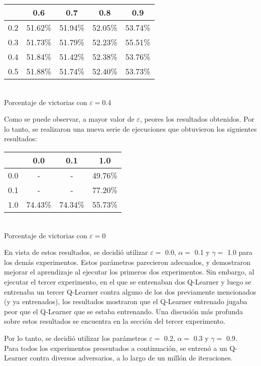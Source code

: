 \begin{center}
\begin{tabular}{|c||c|c|c|c|}
	\hline
	\backslashbox{$\alpha$}{$\gamma$} & 0.6 & 0.7 & 0.8 & 0.9\\
	\hline
	\hline
	0.2 & 51.62\% & 51.94\% & 52.05\% & 53.74\% \\
	\hline
	0.3 & 51.73\% & 51.79\% & 52.23\% & 55.51\% \\
	\hline
	0.4 & 51.84\% & 51.42\% & 52.38\% & \cellcolor{intvier}53.76\% \\
	\hline
	0.5 & 51.88\% & 51.74\% & 52.40\% & 53.73\% \\
	\hline
\end{tabular}\\
Porcentaje de victorias con $\varepsilon=0.4$
\end{center}

Como se puede observar, a mayor valor de $\varepsilon$, peores los resultados obtenidos. Por lo tanto, se realizaron una nueva serie de ejecuciones que obtuvieron los siguientes resultados:
\begin{center}
\begin{tabular}{|c||c|c|c|}
	\hline
	\backslashbox{$\alpha$}{$\gamma$} & 0.0 & 0.1 & 1.0\\
	\hline
	\hline
	0.0 & - & - & 49.76\%\\
	\hline
	0.1 & - & - & \cellcolor{intvier}77.20\%\\
	\hline
	1.0 & 74.43\% & 74.34\% & 55.73\%\\
	\hline
\end{tabular}\\
Porcentaje de victorias con $\varepsilon=0$
\end{center}

En vista de estos resultados, se decidi\'o utilizar $\varepsilon = $ 0.0, $\alpha = $ 0.1 y $\gamma = $ 1.0 para los dem\'as experimentos.
Estos parámetros parecieron adecuados, y demostraron mejorar el aprendizaje al ejecutar los primeros dos experimentos. Sin embargo, al ejecutar el tercer experimento, en el que se entrenaban dos Q-Learner y luego se entrenaba un tercer Q-Learner contra alguno de los dos previamente mencionados (y ya entrenados), los resultados mostraron que el Q-Learner entrenado jugaba peor que el Q-Learner que se estaba entrenando. Una discusión más profunda sobre estos resultados se encuentra en la sección del tercer experimento.

Por lo tanto, se decidió utilizar los parámetros $\varepsilon = $ 0.2, $\alpha = $ 0.3 y $\gamma = $ 0.9.\\

Para todos los experimentos presentados a continuación, se entrenó a un Q-Learner contra diversos adversarios, a lo largo de un millón de iteraciones.







